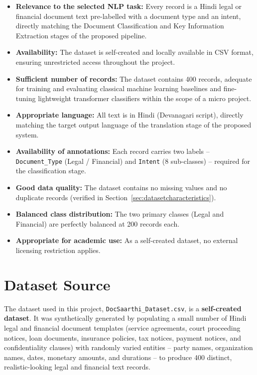 \begin{itemize}
    \item \textbf{Relevance to the selected NLP task:} Every record is a Hindi legal or financial document text pre-labelled with a document type and an intent, directly matching the Document Classification and Key Information Extraction stages of the proposed pipeline.
    \item \textbf{Availability:} The dataset is self-created and locally available in CSV format, ensuring unrestricted access throughout the project.
    \item \textbf{Sufficient number of records:} The dataset contains 400 records, adequate for training and evaluating classical machine learning baselines and fine-tuning lightweight transformer classifiers within the scope of a micro project.
    \item \textbf{Appropriate language:} All text is in Hindi (Devanagari script), directly matching the target output language of the translation stage of the proposed system.
    \item \textbf{Availability of annotations:} Each record carries two labels -- \texttt{Document\_Type} (Legal / Financial) and \texttt{Intent} (8 sub-classes) -- required for the classification stage.
    \item \textbf{Good data quality:} The dataset contains no missing values and no duplicate records (verified in Section~\ref{sec:datasetcharacteristics}).
    \item \textbf{Balanced class distribution:} The two primary classes (Legal and Financial) are perfectly balanced at 200 records each.
    \item \textbf{Appropriate for academic use:} As a self-created dataset, no external licensing restriction applies.
\end{itemize}


\section{Dataset Source}

The dataset used in this project, \texttt{DocSaarthi\_Dataset.csv}, is a \textbf{self-created dataset}. It was synthetically generated by populating a small number of Hindi legal and financial document templates (service agreements, court proceeding notices, loan documents, insurance policies, tax notices, payment notices, and confidentiality clauses) with randomly varied entities -- party names, organization names, dates, monetary amounts, and durations -- to produce 400 distinct, realistic-looking legal and financial text records.

